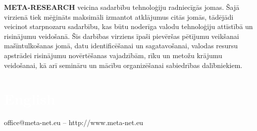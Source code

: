 \begin{multicols}{2}
\textbf{META-RESEARCH }veicina sadarbību tehnoloģiju radniecīgās jomas. 
Šajā virzienā tiek mēģināts maksimāli izmantot atklājumus citās jomās, tādējādi veicinot starpnozaru sadarbību, kas būtu noderīga valodu tehnoloģiju attīstībā un risinājumu veidošanā. 
Šis darbības virziens īpaši pievēršas pētījumu veikšanai mašīntulkošanas jomā, datu identificēšanai un sagatavošanai, valodas resursu apstrādei risinājumu novērtēšanas vajadzībām, rīku un metožu krājumu veidošanai, kā arī semināru un mācību organizēšanai sabiedrības dalībniekiem.


\end{multicols}

\vfill

\makeatletter

\def\@makecaption#1#2{%
  \vskip\abovecaptionskip
 \hfil#1: #2\hfil
  \vskip\belowcaptionskip
  }
  
{
  \renewcommand*{\theHsection}{\thepart.\thesection}
}
\makeatother

\part*{\textcolor{white}{English}}
\setcounter{section}{0}
\setcounter{figure}{0}

\centerline{office@meta-net.eu -- http://www.meta-net.eu}


\cleardoublepage



